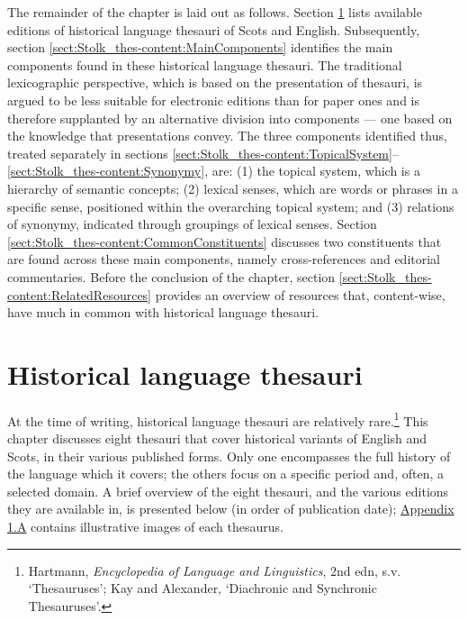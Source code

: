 The remainder of the chapter is laid out as follows. Section \ref{sect:Stolk_thes-content:HLTs} lists available editions of historical language thesauri of Scots and English. Subsequently, section \ref{sect:Stolk_thes-content:MainComponents} identifies the main components found in these historical language thesauri. The traditional lexicographic perspective, which is based on the presentation of thesauri, is argued to be less suitable for electronic editions than for paper ones and is therefore supplanted by an alternative division into components --- one based on the knowledge that presentations convey. 
The three components identified thus, treated separately in sections \ref{sect:Stolk_thes-content:TopicalSystem}--\ref{sect:Stolk_thes-content:Synonymy}, are: (1) the topical system, which is a hierarchy of semantic concepts; (2) lexical senses, which are words or phrases in a specific sense, positioned within the overarching topical system; and (3) relations of synonymy, indicated through groupings of lexical senses. 
Section \ref{sect:Stolk_thes-content:CommonConstituents} discusses two constituents that are found across these main components, namely cross-references and editorial commentaries. Before the conclusion of the chapter, section \ref{sect:Stolk_thes-content:RelatedResources} provides an overview of resources that, content-wise, have much in common with historical language thesauri.


 

\section{Historical language thesauri}
\label{sect:Stolk_thes-content:HLTs}

At the time of writing, historical language thesauri are relatively rare.\footnote{Hartmann, \textit{Encyclopedia of Language and Linguistics}, 2nd edn, s.v. `Thesauruses'; Kay and Alexander, `Diachronic and Synchronic Thesauruses'.} This chapter discusses eight thesauri that cover historical variants of English and Scots, in their various published forms. Only one encompasses the full history of the language which it covers; the others focus on a specific period and, often, a selected domain. A brief overview of the eight thesauri, and the various editions they are available in, is presented below (in order of publication date); \hyperref[Appendix1.A]{Appendix 1.A} contains illustrative images of each thesaurus.

